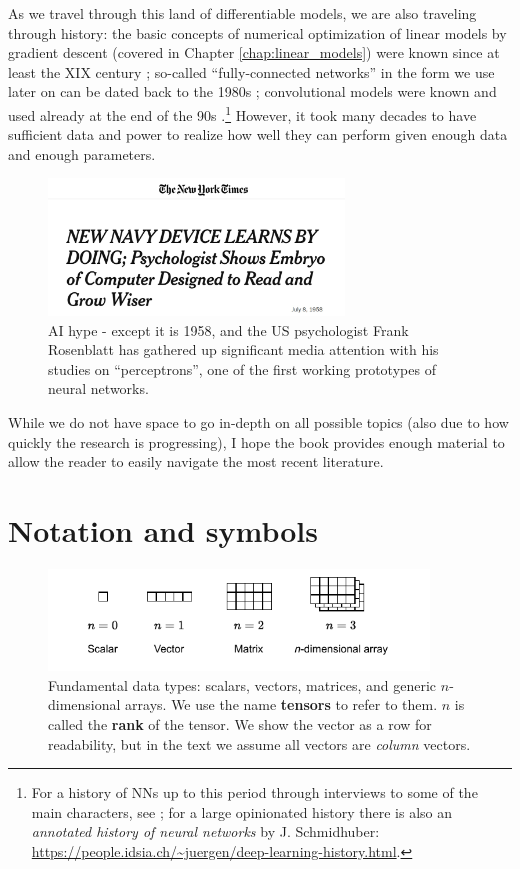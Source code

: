 As we travel through this land of differentiable models, we are also traveling through history: the basic concepts of numerical optimization of linear models by gradient descent (covered in Chapter \ref{chap:linear_models}) were known since at least the XIX century \cite{stigler1981gauss}; so-called ``fully-connected networks'' in the form we use later on can be dated back to the 1980s \cite{rumelhart1986general}; convolutional models were known and used already at the end of the 90s \cite{lecun1998gradient}.\footnote{For a history of NNs up to this period through interviews to some of the main characters, see \cite{anderson2000talking}; for a large opinionated history there is also an \textit{annotated history of neural networks} by J. Schmidhuber: \url{https://people.idsia.ch/~juergen/deep-learning-history.html}.} However, it took many decades to have sufficient data and power to realize how well they can perform given enough data and enough parameters.

\begin{figure}
    \centering
    \includegraphics[width=0.7\textwidth]{images/Rosenblatt_cut.jpg}
    \caption*{AI hype - except it is 1958, and the US psychologist Frank Rosenblatt has gathered up significant media attention with his studies on ``perceptrons'', one of the first working prototypes of neural networks.}
\end{figure}

While we do not have space to go in-depth on all possible topics (also due to how quickly the research is progressing), I hope the book provides enough material to allow the reader to easily navigate the most recent literature.

\section*{Notation and symbols}
\label{sec:notation}

\begin{figure}
    \centering
    \includegraphics[width=0.9\textwidth]{images/Tensors.pdf}
    \caption*{Fundamental data types: scalars, vectors, matrices, and generic $n$-dimensional arrays. We use the name \textbf{tensors} to refer to them. $n$ is called the \textbf{rank} of the tensor. We show the vector as a row for readability, but in the text we assume all vectors are \textit{column} vectors.}
\end{figure}

